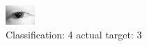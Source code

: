 \begin{figure}[h!]
\begin{center}
\includegraphics[width=0.60\columnwidth]{figures/ID127_class_4_target_3.png}
\end{center}
\caption{ Classification: 4 actual target: 3}
\label{fig:ID127_class_4_target_3}
\end{figure}
